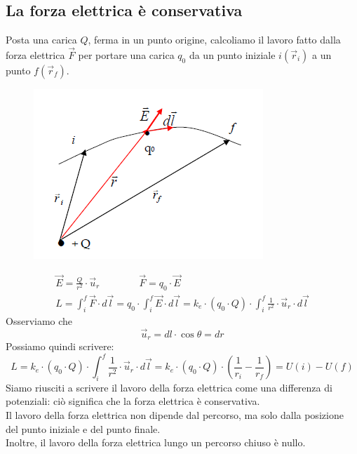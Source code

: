 \subsection{La forza elettrica è conservativa}
Posta una carica $Q$, ferma in un punto origine, calcoliamo il lavoro fatto dalla forza elettrica $\vec{F}$ per portare una carica $q_0$ da un punto iniziale $i(\vec{r}_i)$ a un punto $f(\vec{r}_f)$.
\begin{figure}[h!]
	\centering
	\includegraphics[scale=0.8]{lavoro1}
\end{figure}
\begin{displaymath}\begin{aligned}
\vec{E} = \frac{Q}{r^2} \cdot \vec{u}_r \qquad \qquad 
\vec{F} = q_0 \cdot \vec{E}\\
L = \int_i^f \vec{F} \cdot d\vec{l} = 
q_0 \cdot \int_i^f \vec{E} \cdot d\vec{l}=
k_e \cdot(q_0 \cdot Q) \cdot \int_i^f \frac{1}{r^2} \cdot \vec{u}_r \cdot d\vec{l} 
\end{aligned}\end{displaymath}
Osserviamo che 
\begin{displaymath}
\vec{u}_r = dl \cdot \cos{\theta} = dr
\end{displaymath}
Possiamo quindi scrivere:
\begin{displaymath}
L = k_e \cdot(q_0 \cdot Q) \cdot \int_i^f \frac{1}{r^2} \cdot \vec{u}_r \cdot d\vec{l}=k_e \cdot(q_0 \cdot Q) \cdot \left( \frac{1}{r_i} - \frac{1}{r_f}\right) = U(i)-U(f)
\end{displaymath}
Siamo riusciti a scrivere il lavoro della forza elettrica come una differenza di potenziali: ciò significa che la forza elettrica è conservativa.\\
Il lavoro della forza elettrica non dipende dal percorso, ma solo dalla posizione del punto iniziale e del punto finale.\\
Inoltre, il lavoro della forza elettrica lungo un percorso chiuso è nullo.

